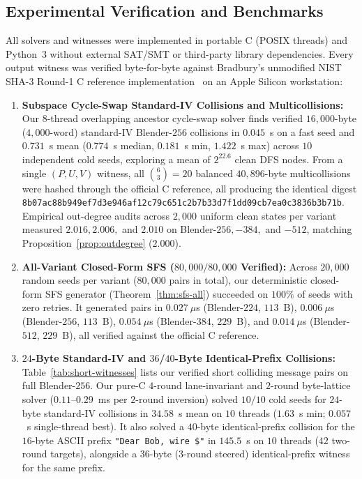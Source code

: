 \documentclass[11pt,a4paper]{article}
\theoremstyle{definition}
\theoremstyle{remark}
\begin{document}
\subsection{Experimental Verification and Benchmarks}
\label{subsec:benchmarks}
All solvers and witnesses were implemented in portable C (POSIX threads) and Python~3 without external SAT/SMT or third-party library dependencies. Every output witness was verified byte-for-byte against Bradbury's unmodified NIST SHA-3 Round-1 C reference implementation~\cite{Bra08} on an Apple Silicon workstation:
\begin{enumerate}[leftmargin=2em]
    \item \textbf{Subspace Cycle-Swap Standard-IV Collisions and Multicollisions:} Our $8$-thread overlapping ancestor cycle-swap solver finds verified $16{,}000$-byte ($4{,}000$-word) standard-IV Blender-$256$ collisions in $0.045$~s on a fast seed and $0.731$~s mean ($0.774$~s median, $0.181$~s min, $1.422$~s max) across $10$ independent cold seeds, exploring a mean of $2^{22.6}$ clean DFS nodes. From a single $(P, U, V)$ witness, all $\binom{6}{3} = 20$ balanced $40{,}896$-byte multicollisions were hashed through the official C reference, all producing the identical digest \texttt{8b07ac88b949ef7d3e946af12c79c651c2b7b33d7f1dd09cb7ea0c3836b3b71b}. Empirical out-degree audits across $2{,}000$ uniform clean states per variant measured $2.016, 2.006,$ and $2.010$ on Blender-$256, -384,$ and $-512$, matching Proposition~\ref{prop:outdegree} ($2.000$).
    \item \textbf{All-Variant Closed-Form SFS ($80{,}000 / 80{,}000$ Verified):} Across $20{,}000$ random seeds per variant ($80{,}000$ pairs in total), our deterministic closed-form SFS generator (Theorem~\ref{thm:sfs-all}) succeeded on $100\%$ of seeds with zero retries. It generated pairs in $0.027~\mu$s (Blender-$224$, $113$~B), $0.006~\mu$s (Blender-$256$, $113$~B), $0.054~\mu$s (Blender-$384$, $229$~B), and $0.014~\mu$s (Blender-$512$, $229$~B), all verified against the official C reference.
    \item \textbf{$24$-Byte Standard-IV and $36$/$40$-Byte Identical-Prefix Collisions:} Table~\ref{tab:short-witnesses} lists our verified short colliding message pairs on full Blender-$256$. Our pure-C $4$-round lane-invariant and $2$-round byte-lattice solver ($0.11\text{--}0.29$~ms per $2$-round inversion) solved $10/10$ cold seeds for $24$-byte standard-IV collisions in $34.58$~s mean on $10$ threads ($1.63$~s min; $0.057$~s single-thread best). It also solved a $40$-byte identical-prefix collision for the $16$-byte ASCII prefix \texttt{"Dear Bob, wire \$"} in $145.5$~s on $10$ threads ($42$ two-round targets), alongside a $36$-byte ($3$-round steered) identical-prefix witness for the same prefix.

\end{enumerate}
\end{document}
